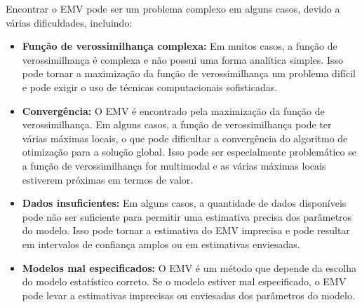 \documentclass[12pt]{beamer}
\begin{document}
\begin{frame}{}
\begin{block}{}
\justifying
Encontrar o EMV pode ser um problema complexo em alguns casos, devido a várias dificuldades, incluindo:

\begin{itemize}
\justifying
    \item \textbf{Função de verossimilhança complexa:} Em muitos casos, a função de verossimilhança é complexa e não possui uma forma analítica simples. Isso pode tornar a maximização da função de verossimilhança um problema difícil e pode exigir o uso de técnicas computacionais sofisticadas.\pause

    \item \textbf{Convergência:} O EMV é encontrado pela maximização da função de verossimilhança. Em alguns casos, a função de verossimilhança pode ter várias máximas locais, o que pode dificultar a convergência do algoritmo de otimização para a solução global. Isso pode ser especialmente problemático se a função de verossimilhança for multimodal e as várias máximas locais estiverem próximas em termos de valor.
\end{itemize}
\end{block}
\end{frame}

\begin{frame}{}
\begin{block}{}
\begin{itemize}
\justifying
    \item \textbf{Dados insuficientes:} Em alguns casos, a quantidade de dados disponíveis pode não ser suficiente para permitir uma estimativa precisa dos parâmetros do modelo. Isso pode tornar a estimativa do EMV imprecisa e pode resultar em intervalos de confiança amplos ou em estimativas enviesadas.\pause

    \item \textbf{Modelos mal especificados:} O EMV é um método que depende da escolha do modelo estatístico correto. Se o modelo estiver mal especificado, o EMV pode levar a estimativas imprecisas ou enviesadas dos parâmetros do modelo.
\end{itemize}
\end{block}
\end{frame}
\end{document}
